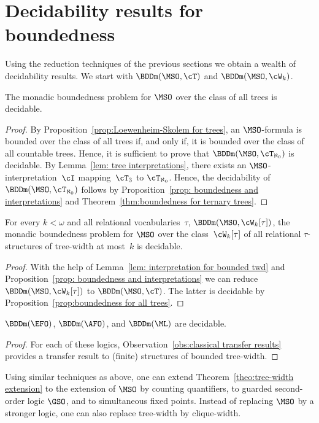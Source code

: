 \documentclass{LMCS}
\begin{document}
\section{Decidability results for boundedness}
\label{sect:decidabilities}
\label{sect:end II}

Using the reduction techniques of the previous sections
we obtain a wealth of decidability results.
We start with $\BDDm(\MSO,\cT)$ and $\BDDm(\MSO,\cW_k)$.
\begin{prop}\label{prop:boundedness for all trees}
The monadic boundedness problem for $\MSO$ over the class of all trees is decidable.
\end{prop}
\begin{proof}
By Proposition~\ref{prop:Loewenheim-Skolem for trees}, an $\MSO$-formula
is bounded over the class of all trees if, and only if, it is bounded over
the class of all countable trees. Hence, it is sufficient to prove that
$\BDDm(\MSO,\cT_{\aleph_0})$ is decidable.
By Lemma~\ref{lem: tree interpretations},
there exists an $\MSO$-interpretation~$\cI$ mapping~$\cT_3$
to $\cT_{\aleph_0}$. Hence, the decidability of $\BDDm(\MSO,\cT_{\aleph_0})$
follows by Proposition~\ref{prop: boundedness and interpretations}
and Theorem~\ref{thm:boundedness for ternary trees}.
\end{proof}
\begin{thm}\label{theo:tree-width extension}
For every $k < \omega$ and all relational vocabularies~$\tau$,
$\BDDm(\MSO,\cW_k[\tau])$, the monadic boundedness problem for $\MSO$
over the class~$\cW_k[\tau]$ of all relational $\tau$-structures
of tree-width at most~$k$ is decidable.
\end{thm}
\begin{proof}
With the help of
Lemma~\ref{lem: interpretation for bounded twd}
and Proposition~\ref{prop: boundedness and interpretations}
we can reduce $\BDDm(\MSO,\cW_k[\tau])$ to $\BDDm(\MSO,\cT)$.
The latter is decidable by
Proposition~\ref{prop:boundedness for all trees}.
\end{proof}

\begin{cor}
$\BDDm(\EFO)$, $\BDDm(\AFO)$, and\/ $\BDDm(\ML)$ are decidable.
\end{cor}
\begin{proof}
For each of these logics,
Observation~\ref{obs:classical transfer results}
provides a transfer result
to (finite) structures of bounded tree-width.
\end{proof}

Using similar techniques as above, one can extend Theorem~\ref{theo:tree-width extension}
to the extension of $\MSO$ by counting quantifiers,
to guarded second-order logic $\GSO$, and to simultaneous fixed points.
Instead of replacing $\MSO$ by a stronger logic,
one can also replace tree-width by clique-width.
\end{document}
